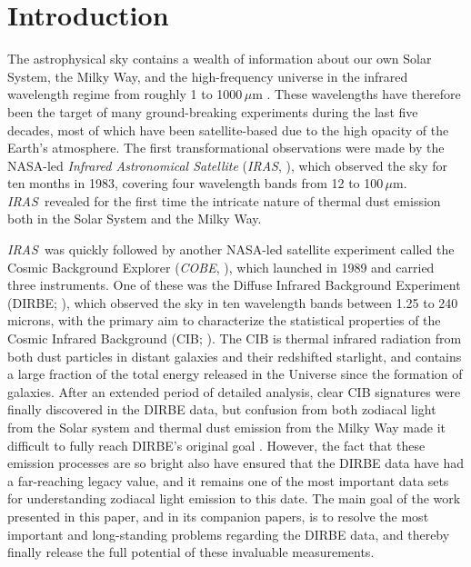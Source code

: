\documentclass{aa}
\def\COBE{\textit{COBE}}
\def\IRAS{\textit{{IRAS}}}
\begin{document}

   \maketitle

\setcounter{tocdepth}{2}
\tableofcontents
   
\section{Introduction}


The astrophysical sky contains a wealth of information about our own Solar System, the Milky Way, and the high-frequency universe in the infrared wavelength regime from roughly 1 to 1000\,$\mu$m \citep[e.g.,][]{johnson:1966,soifer:1987,gardner:2006}. These wavelengths have therefore been the target of many ground-breaking experiments during the last five decades, most of which have been satellite-based due to the high opacity of the Earth's atmosphere. The first transformational observations were made by the NASA-led \textit{Infrared Astronomical Satellite} (\IRAS, \citealt{neugebauer:1984}), which observed the sky for ten months in 1983, covering four wavelength bands from 12 to 100$\,\mu$m. \IRAS\ revealed for the first time the intricate nature of thermal dust emission both in the Solar System and the Milky Way.

\IRAS\ was quickly followed by another NASA-led satellite experiment called the Cosmic Background Explorer (\COBE, \citealt{boggess92}), which launched in 1989 and carried three instruments. One of these was the Diffuse Infrared Background Experiment (DIRBE; \citealp{hauser1998}), which observed the sky in ten wavelength bands between 1.25 to 240 microns, with the primary aim to characterize the statistical properties of the Cosmic Infrared Background (CIB; \citealp{partridge1967}). The CIB is thermal infrared radiation from both dust particles in distant galaxies and their redshifted starlight, and contains a large fraction of the total energy released in the Universe since the formation of galaxies. After an extended period of detailed analysis, clear CIB signatures were finally discovered in the DIRBE data, but confusion from both zodiacal light from the Solar system and thermal dust emission from the Milky Way made it difficult to fully reach DIRBE's original goal \citep{arendt1998,hauser1998,kelsall1998}. However, the fact that these emission processes are so bright also have ensured that the DIRBE data have had a far-reaching legacy value, and it remains one of the most important data sets for understanding zodiacal light emission to this date. The main goal of the work presented in this paper, and in its companion papers, is to resolve the most important and long-standing problems regarding the DIRBE data, and thereby finally release the full potential of these invaluable measurements.
\end{document}
